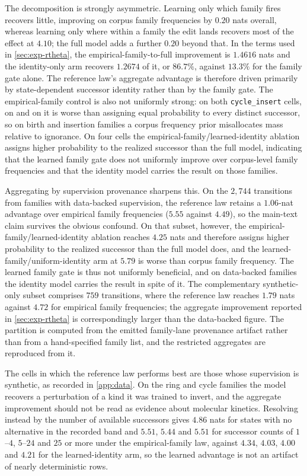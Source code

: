 The decomposition is strongly asymmetric. Learning only which family fires recovers little, improving on corpus family frequencies by $0.20$ nats overall, whereas learning only where within a family the edit lands recovers most of the effect at $4.10$; the full model adds a further $0.20$ beyond that. In the terms used in \cref{sec:exp-rtheta}, the empirical-family-to-full improvement is $1.4616$ nats and the identity-only arm recovers $1.2674$ of it, or $86.7\%$, against $13.3\%$ for the family gate alone. The reference law's aggregate advantage is therefore driven primarily by state-dependent successor identity rather than by the family gate. The empirical-family control is also not uniformly strong: on both \texttt{cycle\_insert} cells, on  and on  it is worse than assigning equal probability to every distinct successor, so on birth and insertion families a corpus frequency prior misallocates mass relative to ignorance. On four cells the empirical-family/learned-identity ablation assigns higher probability to the realized successor than the full model, indicating that the learned family gate does not uniformly improve over corpus-level family frequencies and that the identity model carries the result on those families.

Aggregating by supervision provenance sharpens this. On the $2{,}744$ transitions from families with data-backed supervision, the reference law retains a $1.06$-nat advantage over empirical family frequencies ($5.55$ against $4.49$), so the main-text claim survives the obvious confound. On that subset, however, the empirical-family/learned-identity ablation reaches $4.25$ nats and therefore assigns higher probability to the realized successor than the full model does, and the learned-family/uniform-identity arm at $5.79$ is worse than corpus family frequency. The learned family gate is thus not uniformly beneficial, and on data-backed families the identity model carries the result in spite of it. The complementary synthetic-only subset comprises $759$ transitions, where the reference law reaches $1.79$ nats against $4.72$ for empirical family frequencies; the aggregate improvement reported in \cref{sec:exp-rtheta} is correspondingly larger than the data-backed figure. The partition is computed from the emitted family-lane provenance artifact rather than from a hand-specified family list, and the restricted aggregates are reproduced from it.

The cells in which the reference law performs best are those whose supervision is synthetic, as recorded in \cref{app:data}. On the ring and cycle families the model recovers a perturbation of a kind it was trained to invert, and the aggregate improvement should not be read as evidence about molecular kinetics. Resolving instead by the number of available successors gives $4.86$ nats for states with no alternative in the recorded band and $5.51$, $5.44$ and $5.51$ for successor counts of $1$--$4$, $5$--$24$ and $25$ or more under the empirical-family law, against $4.34$, $4.03$, $4.00$ and $4.21$ for the learned-identity arm, so the learned advantage is not an artifact of nearly deterministic rows.

